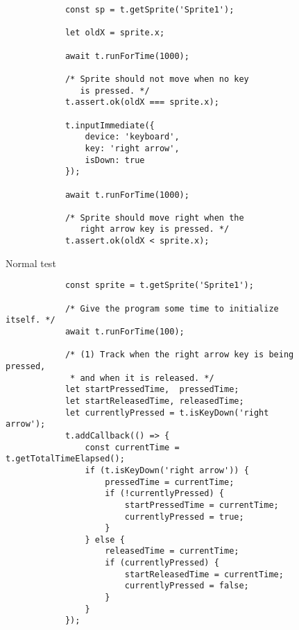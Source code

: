 \begin{listing}[htpb]
    \centering
    \begin{subfigure}[b]{.35\textwidth}
        \centering
        \begin{verbatim}
            const sp = t.getSprite('Sprite1');

            let oldX = sprite.x;

            await t.runForTime(1000);

            /* Sprite should not move when no key
               is pressed. */
            t.assert.ok(oldX === sprite.x);

            t.inputImmediate({
                device: 'keyboard',
                key: 'right arrow',
                isDown: true
            });

            await t.runForTime(1000);

            /* Sprite should move right when the
               right arrow key is pressed. */
            t.assert.ok(oldX < sprite.x);
        \end{verbatim}
        \caption{Normal test}
    \end{subfigure}
    \hspace{.08\textwidth}
    \begin{subfigure}[b]{.55\textwidth}
        \centering
        \begin{verbatim}
            const sprite = t.getSprite('Sprite1');

            /* Give the program some time to initialize itself. */
            await t.runForTime(100);

            /* (1) Track when the right arrow key is being pressed,
             * and when it is released. */
            let startPressedTime,  pressedTime;
            let startReleasedTime, releasedTime;
            let currentlyPressed = t.isKeyDown('right arrow');
            t.addCallback(() => {
                const currentTime = t.getTotalTimeElapsed();
                if (t.isKeyDown('right arrow')) {
                    pressedTime = currentTime;
                    if (!currentlyPressed) {
                        startPressedTime = currentTime;
                        currentlyPressed = true;
                    }
                } else {
                    releasedTime = currentTime;
                    if (currentlyPressed) {
                        startReleasedTime = currentTime;
                        currentlyPressed = false;
                    }
                }
            });


\end{verbatim}
\end{subfigure}
\end{listing}
